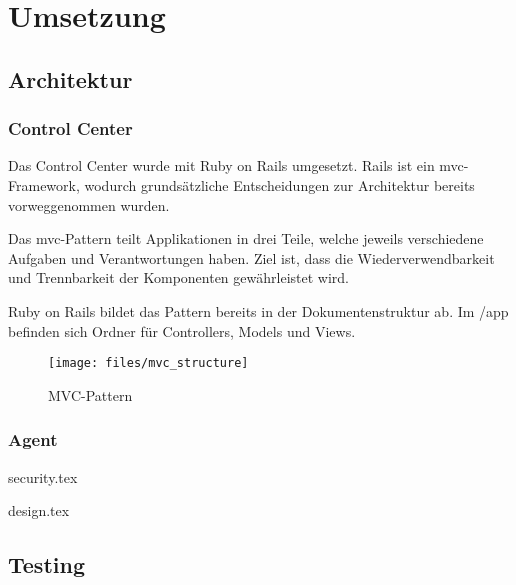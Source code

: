 \chapter{Umsetzung}


\section{Architektur}


\subsection*{Control Center}

Das Control Center wurde mit Ruby on Rails umgesetzt. Rails ist ein \gls{mvc}-Framework, wodurch grundsätzliche Entscheidungen zur Architektur bereits vorweggenommen wurden.

Das \gls{mvc}-Pattern teilt Applikationen in drei Teile, welche jeweils verschiedene Aufgaben und Verantwortungen haben. Ziel ist, dass die Wiederverwendbarkeit und Trennbarkeit der Komponenten gewährleistet wird.

Ruby on Rails bildet das Pattern bereits in der Dokumentenstruktur ab. Im /app befinden sich Ordner für Controllers, Models und Views.

\begin{figure}[H]
	\centering
	\texttt{[image: files/mvc\_structure]}
	\caption{MVC-Pattern}
	\label{fig:tec:mvc}
\end{figure}

\subsection*{Agent}

\xxx

\clearpage
{security.tex}

\clearpage
{design.tex}

\clearpage
\section{Testing}

